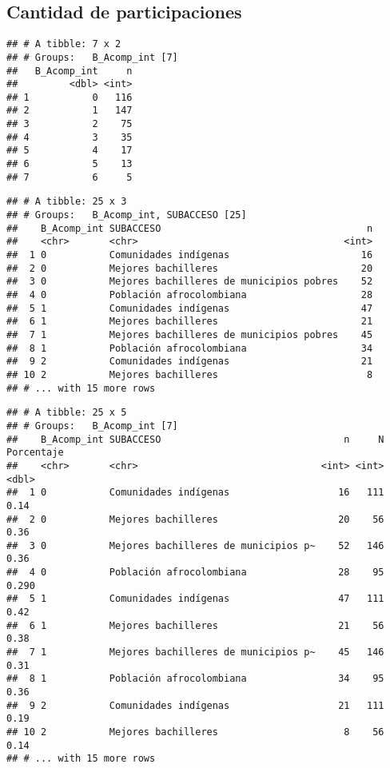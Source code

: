 \documentclass[]{article}
\theoremstyle{definition}
\theoremstyle{definition}
\theoremstyle{definition}
\theoremstyle{remark}
\begin{document}
\subsection{Cantidad de
participaciones}\label{cantidad-de-participaciones}

\begin{verbatim}
## # A tibble: 7 x 2
## # Groups:   B_Acomp_int [7]
##   B_Acomp_int     n
##         <dbl> <int>
## 1           0   116
## 2           1   147
## 3           2    75
## 4           3    35
## 5           4    17
## 6           5    13
## 7           6     5
\end{verbatim}

\begin{verbatim}
## # A tibble: 25 x 3
## # Groups:   B_Acomp_int, SUBACCESO [25]
##    B_Acomp_int SUBACCESO                                    n
##    <chr>       <chr>                                    <int>
##  1 0           Comunidades indígenas                       16
##  2 0           Mejores bachilleres                         20
##  3 0           Mejores bachilleres de municipios pobres    52
##  4 0           Población afrocolombiana                    28
##  5 1           Comunidades indígenas                       47
##  6 1           Mejores bachilleres                         21
##  7 1           Mejores bachilleres de municipios pobres    45
##  8 1           Población afrocolombiana                    34
##  9 2           Comunidades indígenas                       21
## 10 2           Mejores bachilleres                          8
## # ... with 15 more rows
\end{verbatim}

\begin{verbatim}
## # A tibble: 25 x 5
## # Groups:   B_Acomp_int [7]
##    B_Acomp_int SUBACCESO                                n     N Porcentaje
##    <chr>       <chr>                                <int> <int>      <dbl>
##  1 0           Comunidades indígenas                   16   111      0.14 
##  2 0           Mejores bachilleres                     20    56      0.36 
##  3 0           Mejores bachilleres de municipios p~    52   146      0.36 
##  4 0           Población afrocolombiana                28    95      0.290
##  5 1           Comunidades indígenas                   47   111      0.42 
##  6 1           Mejores bachilleres                     21    56      0.38 
##  7 1           Mejores bachilleres de municipios p~    45   146      0.31 
##  8 1           Población afrocolombiana                34    95      0.36 
##  9 2           Comunidades indígenas                   21   111      0.19 
## 10 2           Mejores bachilleres                      8    56      0.14 
## # ... with 15 more rows
\end{verbatim}
\end{document}
